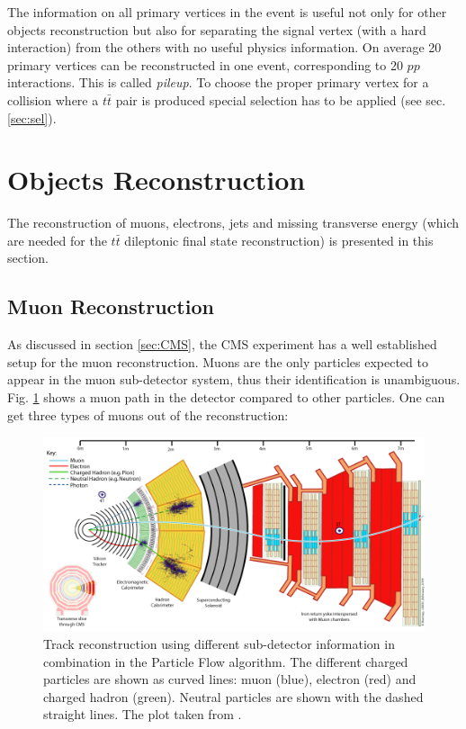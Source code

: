 The information on all primary vertices in the event is useful not only for other objects reconstruction but also for separating the signal vertex (with a hard interaction) 
from the others with no useful physics information. On average 20 primary vertices can be reconstructed in one event, corresponding to 20 $pp$ interactions. This is called
\textit{pileup}. To choose the proper primary vertex for a collision where a $t\bar{t}$ pair is produced special selection has to be applied (see sec. \ref{sec:sel}).

\section{Objects Reconstruction}

The reconstruction of muons, electrons, jets and missing transverse energy (which are needed for the $t\bar{t}$ dileptonic final
state reconstruction) is presented in this section.

\subsection{Muon Reconstruction}

As discussed in section \ref{sec:CMS}, the CMS experiment has a well established setup for the muon reconstruction.
Muons are the only particles expected to appear in the muon sub-detector system, thus their identification is unambiguous.
Fig. \ref{fig:PFmuons} shows a muon path in the detector compared to other particles.
One can get three types of muons out of the reconstruction:

\begin{figure}[t]
  \centering
  \includegraphics[width=1.0\textwidth]{04_event_reconstruction/plots/CMS_Slice.png}
  \caption{Track reconstruction using different sub-detector information in combination in the Particle Flow algorithm. The different
  charged particles are shown as curved lines: muon (blue), electron (red) and charged hadron (green). Neutral particles are shown
  with the dashed straight lines. The plot taken from \cite{PFMuon}.}
  \label{fig:PFmuons}
\end{figure}

